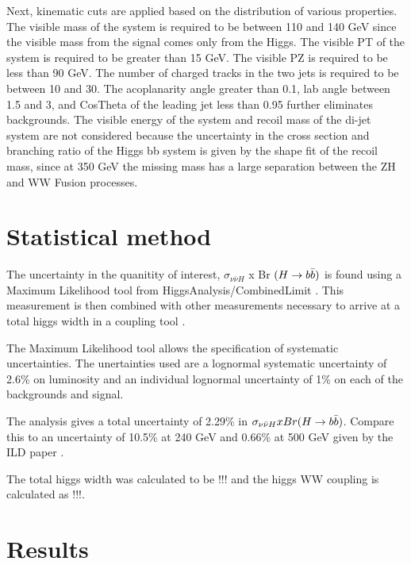 \documentclass[preprintnumbers,nofootinbib,noshowpacs,eqsecnum,prd,superscriptaddress,letterpaper]{revtex4}
\begin{document}
Next, kinematic cuts are applied based on the distribution of various properties. The visible mass of the system is required to be between 110 and 140 GeV since the visible mass from the signal comes only from the Higgs. The visible PT of the system is required to be greater than 15 GeV. The visible PZ is required to be less than 90 GeV. The number of charged tracks in the two jets is required to be between 10 and 30. The acoplanarity angle greater than 0.1, lab angle between 1.5 and 3, and CosTheta of the leading jet less than 0.95 further eliminates backgrounds. The visible energy of the system and recoil mass of the di-jet system are not considered because the uncertainty in the cross section and branching ratio of the Higgs bb system is given by the shape fit of the recoil mass, since at 350 GeV the missing mass has a large separation between the ZH and WW Fusion processes. 

\section{Statistical method}
\label{sec:method}

The uncertainty in the quanitity of interest, $\sigma_{\nu\bar{\nu}H}$ x Br $(H \rightarrow b\bar{b})$ is found using a Maximum Likelihood tool from HiggsAnalysis/CombinedLimit \cite{higgsanalysis}. This measurement is then combined with other measurements necessary to arrive at a total higgs width in a coupling tool \cite{couplingtool}.

The Maximum Likelihood tool allows the specification of systematic uncertainties. The unertainties used are a lognormal systematic uncertainty of 2.6\% on luminosity and an individual lognormal uncertainty of 1\% on each of the backgrounds and signal.

The analysis gives a total uncertainty of 2.29\% in $\sigma_{\nu\bar{\nu}H} x Br(H \rightarrow b\bar{b})$. Compare this to an uncertainty of 10.5\% at 240 GeV and 0.66\% at 500 GeV given by the ILD paper \cite{ILD}.

The total higgs width was calculated to be !!! and the higgs WW coupling is calculated as !!!.

\section{Results}
\label{sec:results}
\end{document}
